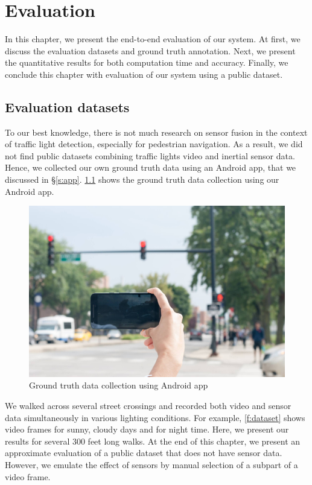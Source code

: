 \chapter{Evaluation}
\label{c:evalu}

In this chapter, we present the end-to-end evaluation of our system.
At first, we discuss the evaluation datasets and ground truth annotation.
Next, we present the quantitative results for both computation time and accuracy.
Finally, we conclude this chapter with evaluation of our system using a public dataset.

\section{Evaluation datasets}
\label{s:eval}
To our best knowledge, there is not much research on sensor fusion in the context of traffic light detection, especially for pedestrian navigation. 
As a result, we did not find public datasets combining traffic lights video and inertial sensor data. 
Hence, we collected our own ground truth data using an Android app, that we discussed in \S\ref{s:app}.
\ref{f:ground_truth} shows the ground truth data collection using our Android app.

\begin{figure}[ht]
\centering
\includegraphics[width=5.2in]{images/ground_truth.jpg}
\caption{Ground truth data collection using Android app}
\label{f:ground_truth}
\end{figure}

We walked across several street crossings and recorded both video and sensor data simultaneously in various lighting conditions. 
For example, \ref{f:dataset} shows video frames for sunny, cloudy days and for night time. 
Here, we present our results for several 300 feet long walks.  
At the end of this chapter, we present an approximate evaluation of a public dataset that does not have sensor data. 
However, we emulate the effect of sensors by manual selection of a subpart of a video frame. 


